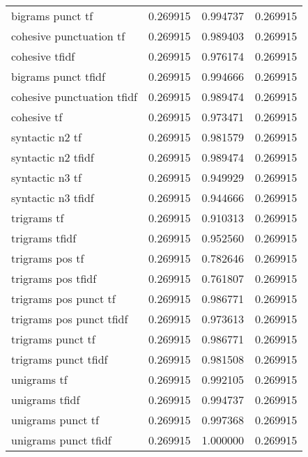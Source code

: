 \begin{tabular}{lrrr}
bigrams punct tf           &  0.269915 &       0.994737 &             0.269915 \\
cohesive punctuation tf    &  0.269915 &       0.989403 &             0.269915 \\
cohesive tfidf             &  0.269915 &       0.976174 &             0.269915 \\
bigrams punct tfidf        &  0.269915 &       0.994666 &             0.269915 \\
cohesive punctuation tfidf &  0.269915 &       0.989474 &             0.269915 \\
cohesive tf                &  0.269915 &       0.973471 &             0.269915 \\
syntactic n2 tf            &  0.269915 &       0.981579 &             0.269915 \\
syntactic n2 tfidf         &  0.269915 &       0.989474 &             0.269915 \\
syntactic n3 tf            &  0.269915 &       0.949929 &             0.269915 \\
syntactic n3 tfidf         &  0.269915 &       0.944666 &             0.269915 \\
trigrams tf                &  0.269915 &       0.910313 &             0.269915 \\
trigrams tfidf             &  0.269915 &       0.952560 &             0.269915 \\
trigrams pos tf            &  0.269915 &       0.782646 &             0.269915 \\
trigrams pos tfidf         &  0.269915 &       0.761807 &             0.269915 \\
trigrams pos punct tf      &  0.269915 &       0.986771 &             0.269915 \\
trigrams pos punct tfidf   &  0.269915 &       0.973613 &             0.269915 \\
trigrams punct tf          &  0.269915 &       0.986771 &             0.269915 \\
trigrams punct tfidf       &  0.269915 &       0.981508 &             0.269915 \\
unigrams tf                &  0.269915 &       0.992105 &             0.269915 \\
unigrams tfidf             &  0.269915 &       0.994737 &             0.269915 \\
unigrams punct tf          &  0.269915 &       0.997368 &             0.269915 \\
unigrams punct tfidf       &  0.269915 &       1.000000 &             0.269915 \\
\bottomrule
\end{tabular}
